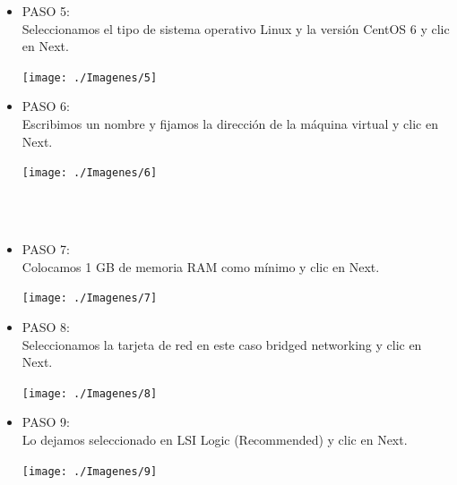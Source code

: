 	
	\begin{itemize}

\item PASO 5:
\\Seleccionamos  el tipo de sistema operativo Linux y la versión CentOS 6 y clic en Next.
		\begin{center}
		\texttt{[image: ./Imagenes/5]}
		\end{center}
	

	\end{itemize} 

	\begin{itemize}
\item PASO 6:
\\Escribimos un nombre y fijamos la dirección de la máquina virtual y clic en Next.
		\begin{center}
		\texttt{[image: ./Imagenes/6]}
		\end{center}
		\\\

	\end{itemize} 

	\begin{itemize}
\item PASO 7:
\\Colocamos 1 GB de memoria RAM como mínimo y clic en Next.
		\begin{center}
		\texttt{[image: ./Imagenes/7]}
		\end{center}
	

	\end{itemize} 

	\begin{itemize}
\item PASO 8:
\\Seleccionamos la tarjeta de red en este caso bridged networking y clic en Next.
		\begin{center}
		\texttt{[image: ./Imagenes/8]}
		\end{center}
	

	\end{itemize} 

	\begin{itemize}
\item PASO 9:
\\Lo dejamos seleccionado en LSI Logic (Recommended) y clic en Next.
		\begin{center}
		\texttt{[image: ./Imagenes/9]}
		\end{center}
	

	\end{itemize} 

